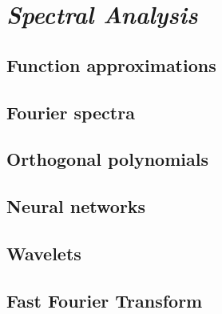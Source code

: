 \chapter{\emph{Spectral Analysis}} 
\label{spectral}


\section{Function approximations}
\section{Fourier spectra}
\section{Orthogonal polynomials}
\section{Neural networks}
\section{Wavelets}
\section{Fast Fourier Transform}
